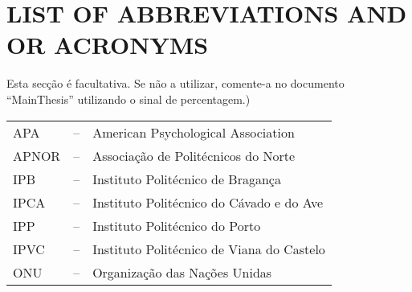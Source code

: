 \chapter{LIST OF ABBREVIATIONS AND OR ACRONYMS}
Esta secção é facultativa. Se não a utilizar, comente-a no documento ``MainThesis'' utilizando o sinal de percentagem.)

\vspace{1cm}

{
	
	
\setlength\arrayrulewidth{0pt}
\begin{tabular}{|l|l|l|}
\hline



APA & -- & American Psychological Association \\
APNOR & -- &  Associação de Politécnicos do Norte \\
IPB & -- &  Instituto Politécnico de Bragança \\
IPCA & -- & Instituto Politécnico do Cávado e do Ave \\
IPP & -- & Instituto Politécnico do Porto \\
IPVC & -- & Instituto Politécnico de Viana do Castelo \\
ONU & -- & Organização das Nações Unidas \\



\hline
\end{tabular}
}






